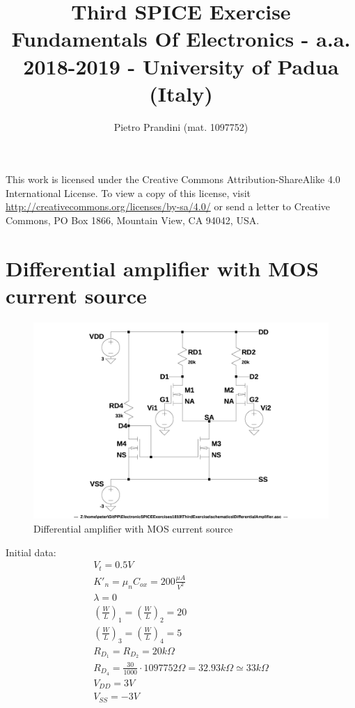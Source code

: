 \documentclass[10pt,a4paper]{book}
\title{Third SPICE Exercise\\{\small{Fundamentals Of Electronics - a.a. 2018-2019 -
University of Padua (Italy)}}}
\author{Pietro Prandini (mat. 1097752)}
\begin{document}
\maketitle

\vspace*{\fill}
\begin{center}
\tiny{This work is licensed under the Creative Commons Attribution-ShareAlike 4.0 International License. To view a copy of this license, visit \href{http://creativecommons.org/licenses/by-sa/4.0/}{http://creativecommons.org/licenses/by-sa/4.0/} or send a letter to Creative Commons, PO Box 1866, Mountain View, CA 94042, USA.}
\end{center}

\tableofcontents

\chapter{Differential amplifier with MOS current source}\label{diffampchapter}

\begin{figure}[h]
  \centering
  \includegraphics[width=12cm]{schematics/DifferentialAmplifier.jpg}
  \caption{Differential amplifier with MOS current source}
  \label{DifferentialAmplifier}
\end{figure}

Initial data:\\
\begin{align}
V_t = 0.5V\\
{K'}_n = {\mu}_n C_{ox} = 200 \frac{\mu A}{V^2}\\
\lambda = 0\\
\left(\frac{W}{L}\right)_1 = \left(\frac{W}{L}\right)_2 = 20\\
\left(\frac{W}{L}\right)_3 = \left(\frac{W}{L}\right)_4 = 5\\
R_{D_1} = R_{D_2} = 20k\Omega\\
R_{D_4} = \frac{30}{1000}\cdot 1097752 \Omega = 32.93k\Omega \simeq 33k\Omega\\
V_{DD} = 3V\\
V_{SS} = -3V
\end{align}
\end{document}
